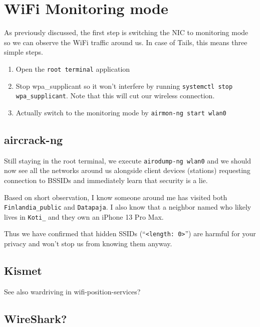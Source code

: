 \documentclass[../wifi-security.tex]{subfiles}
\begin{document}
\chapter{WiFi Monitoring mode}


As previously discussed, %
the first step is switching the NIC to monitoring mode so we can observe the WiFi traffic around us.
In case of Tails, this means three simple steps.

\begin{enumerate}
	\item Open the \texttt{root terminal} application
	\item Stop wpa\_supplicant so it won't interfere by running \texttt{systemctl stop wpa\_supplicant}. Note that this will cut our wireless connection.
	\item Actually switch to the monitoring mode by \texttt{airmon-ng start wlan0}
\end{enumerate}


\section{aircrack-ng}

Still staying in the root terminal, we execute \texttt{airodump-ng wlan0} and we should now see all the networks around us alongside client devices (stations) requesting connection to BSSIDs and immediately learn that security is a lie.

Based on short observation, I know someone around me has visited both \texttt{Finlandia\_public} and \texttt{Datapaja}. I also know that a neighbor named \Name who likely lives in \texttt{Koti\_\Name} and they own an iPhone 13 Pro Max.

Thus we have confirmed that hidden SSIDs (``\texttt{<length: 0>}'') are harmful for your privacy and won't stop us from knowing them anyway.

\section{Kismet}

See also wardriving in wifi-position-services?

\section{WireShark?}
\end{document}
